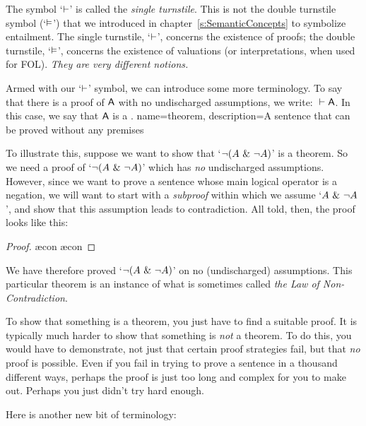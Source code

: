 The symbol `$\vdash$' is called the \emph{single turnstile}. This is not the {double turnstile} symbol (`$\vDash$') that we introduced in chapter~\ref{s:SemanticConcepts} to symbolize entailment. The single turnstile, `$\vdash$', concerns the existence of proofs; the double turnstile, `$\vDash$', concerns the existence of valuations (or interpretations, when used for FOL). \emph{They are very different notions.}

Armed with our `$\vdash$' symbol, we can introduce some more terminology. To say that there is a proof of $\mathsf{A}$ with no undischarged assumptions, we write: ${} \vdash \mathsf{A}$. In this case, we say that $\mathsf{A}$ is a .
{
name=theorem,
description={A sentence that can be proved without any premises}
}

        To illustrate this, suppose we want to show that `${\neg} (A ~\&~ {\neg} A)$' is a theorem.  So we need a proof of `${\neg}(A ~\&~ {\neg} A)$' which has \emph{no} undischarged assumptions. However, since we want to prove a sentence whose main logical operator is a negation, we will want to start with a \emph{subproof} within which we assume `$A ~\&~ {\neg} A$', and show that this assumption leads to contradiction. All told, then, the proof looks like this:
	\begin{proof}
		\open
			\ae{con}
			\ae{con}
		\close
	\end{proof}
We have therefore proved `${\neg} (A ~\&~ {\neg} A)$' on no (undischarged) assumptions. This particular theorem is an instance of what is sometimes called \emph{the Law of Non-Contradiction}.

To show that something is a theorem, you just have to find a suitable proof. It is typically much harder to show that something is \emph{not} a theorem. To do this, you would have to demonstrate, not just that certain proof strategies fail, but that \emph{no} proof is possible. Even if you fail in trying to prove a sentence in a thousand different ways, perhaps the proof is just too long and complex for you to make out. Perhaps you just didn't try hard enough.

Here is another new bit of terminology:
        
